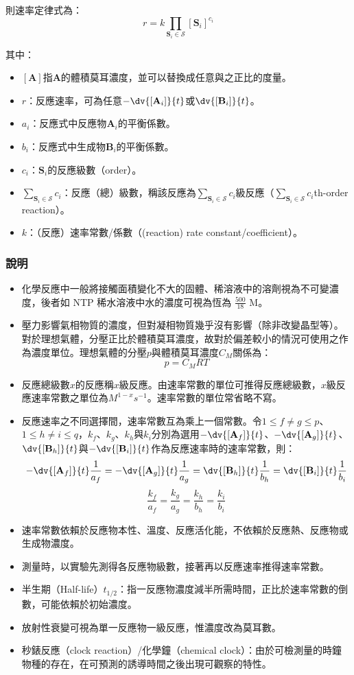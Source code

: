 \documentclass[a4paper,12pt]{article}
\begin{document}
則速率定律式為：
\[r=k\prod_{\mathbf{S}_i\in\mathscr{S}}[\mathbf{S}_i]^{c_i}\]

其中：
\begin{itemize}
\item $[\mathbf{A}]$指$\mathbf{A}$的體積莫耳濃度，並可以替換成任意與之正比的度量。
\item $r$：反應速率，可為任意$-\dv{[\mathbf{A}_i]}{t}$或$\dv{[\mathbf{B}_i]}{t}$。
\item $a_i$：反應式中反應物$\mathbf{A}_i$的平衡係數。
\item $b_i$：反應式中生成物$\mathbf{B}_i$的平衡係數。
\item $c_i$：$\mathbf{S}_i$的反應級數（order）。
\item $\sum_{\mathbf{S}_i\in\mathscr{S}}c_i$：反應（總）級數，稱該反應為$\sum_{\mathbf{S}_i\in\mathscr{S}}c_i$級反應（$\sum_{\mathbf{S}_i\in\mathscr{S}}c_i$th-order reaction）。
\item $k$：（反應）速率常數/係數（(reaction) rate constant/coefficient）。
\end{itemize}
\subsubsection{說明}
\begin{itemize}
\item 化學反應中一般將接觸面積變化不大的固體、稀溶液中的溶劑視為不可變濃度，後者如 NTP 稀水溶液中水的濃度可視為恆為 $\frac{500}{18}$ M。
\item 壓力影響氣相物質的濃度，但對凝相物質幾乎沒有影響（除非改變晶型等）。對於理想氣體，分壓正比於體積莫耳濃度，故對於偏差較小的情況可使用之作為濃度單位。理想氣體的分壓$p$與體積莫耳濃度$C_M$關係為：
\[p=C_MRT\]
\item 反應總級數$x$的反應稱$x$級反應。由速率常數的單位可推得反應總級數，$x$級反應速率常數之單位為$M^{1-x}s^{-1}$。速率常數的單位常省略不寫。
\item 反應速率之不同選擇間，速率常數互為乘上一個常數。令$1\leq f\neq g\leq p$、$1\leq h\neq i\leq q$，$k_f$、$k_g$、$k_h$與$k_i$分別為選用$-\dv{[\mathbf{A}_f]}{t}$、$-\dv{[\mathbf{A}_g]}{t}$、$\dv{[\mathbf{B}_h]}{t}$與$-\dv{[\mathbf{B}_i]}{t}$作為反應速率時的速率常數，則：
\[-\dv{[\mathbf{A}_f]}{t}\frac{1}{a_f}=-\dv{[\mathbf{A}_g]}{t}\frac{1}{a_g}=\dv{[\mathbf{B}_h]}{t}\frac{1}{b_h}=\dv{[\mathbf{B}_i]}{t}\frac{1}{b_i}\]
\[\frac{k_f}{a_f}=\frac{k_g}{a_g}=\frac{k_h}{b_h}=\frac{k_i}{b_i}\]
\item 速率常數依賴於反應物本性、溫度、反應活化能，不依賴於反應熱、反應物或生成物濃度。
\item 測量時，以實驗先測得各反應物級數，接著再以反應速率推得速率常數。
\item 半生期（Half-life）$t_{1/2}$：指一反應物濃度減半所需時間，正比於速率常數的倒數，可能依賴於初始濃度。
\item 放射性衰變可視為單一反應物一級反應，惟濃度改為莫耳數。
\item 秒錶反應（clock reaction）/化學鐘（chemical clock）：由於可檢測量的時鐘物種的存在，在可預測的誘導時間之後出現可觀察的特性。
\end{itemize}
\end{document}
